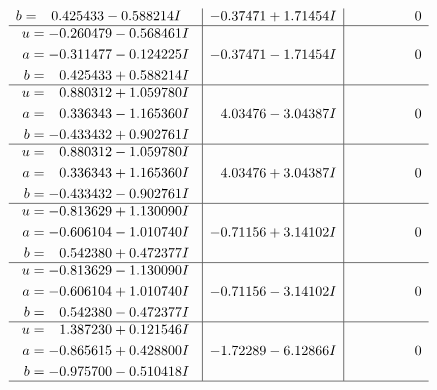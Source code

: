 \documentclass[1p]{elsarticle_modified}
\theoremstyle{definition}
\begin{document}
$$\begin{array}{c|c|c}
\begin{aligned}
b &= \phantom{-}0.425433 - 0.588214 I\end{aligned}
 & -0.37471 + 1.71454 I & \phantom{-0.000000 } 0 \\ \hline\begin{aligned}
u &= -0.260479 - 0.568461 I \\
a &= -0.311477 - 0.124225 I \\
b &= \phantom{-}0.425433 + 0.588214 I\end{aligned}
 & -0.37471 - 1.71454 I & \phantom{-0.000000 } 0 \\ \hline\begin{aligned}
u &= \phantom{-}0.880312 + 1.059780 I \\
a &= \phantom{-}0.336343 - 1.165360 I \\
b &= -0.433432 + 0.902761 I\end{aligned}
 & \phantom{-}4.03476 - 3.04387 I & \phantom{-0.000000 } 0 \\ \hline\begin{aligned}
u &= \phantom{-}0.880312 - 1.059780 I \\
a &= \phantom{-}0.336343 + 1.165360 I \\
b &= -0.433432 - 0.902761 I\end{aligned}
 & \phantom{-}4.03476 + 3.04387 I & \phantom{-0.000000 } 0 \\ \hline\begin{aligned}
u &= -0.813629 + 1.130090 I \\
a &= -0.606104 - 1.010740 I \\
b &= \phantom{-}0.542380 + 0.472377 I\end{aligned}
 & -0.71156 + 3.14102 I & \phantom{-0.000000 } 0 \\ \hline\begin{aligned}
u &= -0.813629 - 1.130090 I \\
a &= -0.606104 + 1.010740 I \\
b &= \phantom{-}0.542380 - 0.472377 I\end{aligned}
 & -0.71156 - 3.14102 I & \phantom{-0.000000 } 0 \\ \hline\begin{aligned}
u &= \phantom{-}1.387230 + 0.121546 I \\
a &= -0.865615 + 0.428800 I \\
b &= -0.975700 - 0.510418 I\end{aligned}
 & -1.72289 - 6.12866 I & \phantom{-0.000000 } 0\\
 \hline 
 \end{array}$$\newpage$$\begin{array}{c|c|c}  

\end{array}$$
\end{document}
